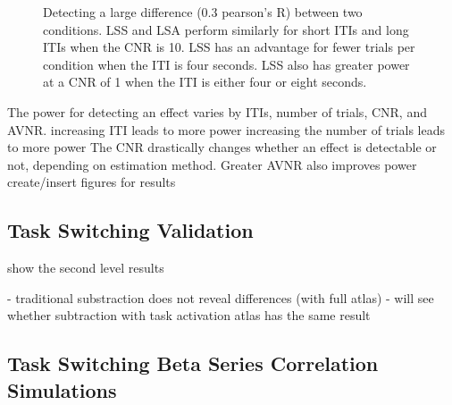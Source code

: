 \documentclass[10pt,letterpaper]{article}
\begin{document}
\begin{figure}[H]
  \ContinuedFloat
  \centering
  \subfloat{}

  \subfloat{}
  \caption{
    Detecting a large difference (0.3 pearson's R) between two conditions.
    LSS and LSA perform similarly for short ITIs and long ITIs when the CNR is 10.
    LSS has an advantage for fewer trials per condition when the ITI is four seconds.
    LSS also has greater power at a CNR of 1 when the ITI is either four or
    eight seconds.
    }
  \label{fig:dlarge}
\end{figure}
The power for detecting an effect varies by ITIs, number of trials, CNR, and AVNR.
increasing ITI leads to more power
increasing the number of trials leads to more power
The CNR drastically changes whether an effect is detectable or not, depending on estimation method.
Greater AVNR also improves power
create/insert figures for results


\subsection*{Task Switching Validation}
show the second level results

- traditional substraction does not reveal differences (with full atlas)
- will see whether subtraction with task activation atlas has the same result

\subsection*{Task Switching Beta Series Correlation Simulations}
\end{document}
